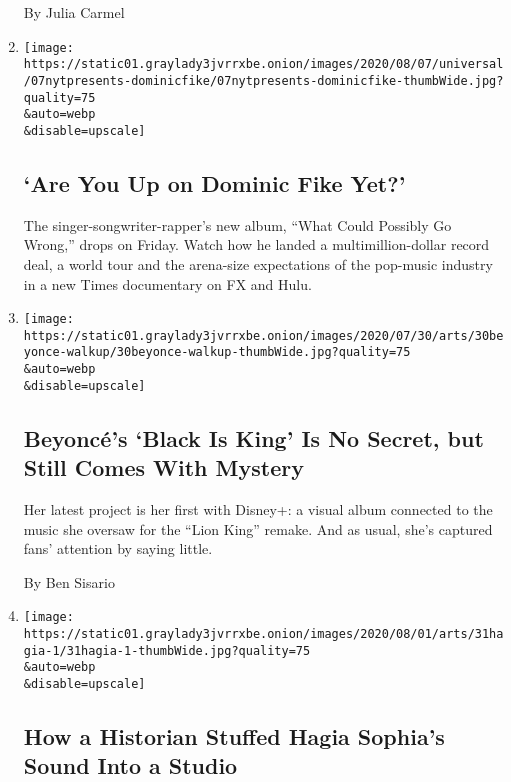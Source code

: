 \begin{enumerate}
  By Julia Carmel
\item
  \href{/article/dominic-fike-at-first.html}{}

  \texttt{[image: https://static01.graylady3jvrrxbe.onion/images/2020/08/07/universal/07nytpresents-dominicfike/07nytpresents-dominicfike-thumbWide.jpg?quality=75\\\&auto=webp\\\&disable=upscale]}

  \hypertarget{are-you-up-on-dominic-fike-yet}{%
  \subsection{`Are You Up on Dominic Fike
  Yet?'}\label{are-you-up-on-dominic-fike-yet}}

  The singer-songwriter-rapper's new album, ``What Could Possibly Go
  Wrong,'' drops on Friday. Watch how he landed a multimillion-dollar
  record deal, a world tour and the arena-size expectations of the
  pop-music industry in a new Times documentary on FX and Hulu.
\item
  \href{/2020/07/30/arts/music/beyonce-black-is-king.html}{}

  \texttt{[image: https://static01.graylady3jvrrxbe.onion/images/2020/07/30/arts/30beyonce-walkup/30beyonce-walkup-thumbWide.jpg?quality=75\\\&auto=webp\\\&disable=upscale]}

  \hypertarget{beyoncuxe9s-black-is-king-is-no-secret-but-still-comes-with-mystery}{%
  \subsection{Beyoncé's `Black Is King' Is No Secret, but Still Comes
  With
  Mystery}\label{beyoncuxe9s-black-is-king-is-no-secret-but-still-comes-with-mystery}}

  Her latest project is her first with Disney+: a visual album connected
  to the music she oversaw for the ``Lion King'' remake. And as usual,
  she's captured fans' attention by saying little.

  By Ben Sisario
\item
  \href{/2020/07/30/arts/music/hagia-sophia-acoustics-music.html}{}

  \texttt{[image: https://static01.graylady3jvrrxbe.onion/images/2020/08/01/arts/31hagia-1/31hagia-1-thumbWide.jpg?quality=75\\\&auto=webp\\\&disable=upscale]}

  \hypertarget{how-a-historian-stuffed-hagia-sophias-sound-into-a-studio}{%
  \subsection{How a Historian Stuffed Hagia Sophia's Sound Into a
  Studio}\label{how-a-historian-stuffed-hagia-sophias-sound-into-a-studio}}


\end{enumerate}
